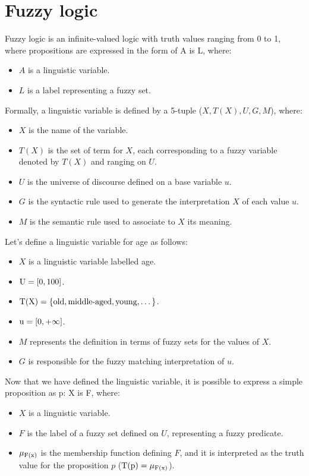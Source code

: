 \section{Fuzzy logic}

Fuzzy logic is an infinite-valued logic with truth values ranging from 0 to 1, where propositions are expressed in the form of A is L, where:
\begin{itemize}
    \item $A$ is a linguistic variable.
    \item $L$ is a label representing a fuzzy set.
\end{itemize}
Formally, a linguistic variable is defined by a 5-tuple ($X, T(X), U, G, M$), where: 
\begin{itemize}
    \item $X$ is the name of the variable.
    \item $T(X)$ is the set of term for $X$, each corresponding to a fuzzy variable denoted by $T(X)$ and ranging on $U$.
    \item $U$ is the universe of discourse defined on a base variable $u$.
    \item $G$ is the syntactic rule used to generate the interpretation $X$ of each value $u$.
    \item $M$ is the semantic rule used to associate to $X$ its meaning.
\end{itemize}
\begin{example}
    Let's define a linguistic variable for age as follows:
    \begin{itemize}
        \item $X$ is a linguistic variable labelled age.
        \item $\textnormal{U}=[0,100]$.
        \item $\textnormal{T(X)}=\{\text{old}, \text{middle-aged}, \text{young}, \dots\}$.
        \item $\textnormal{u}=[0,+\infty]$.
        \item $M$ represents the definition in terms of fuzzy sets for the values of $X$.
        \item $G$ is responsible for the fuzzy matching interpretation of $u$.
    \end{itemize}
\end{example}
Now that we have defined the linguistic variable, it is possible to express a simple proposition as p: X is F, where:
\begin{itemize}
    \item $X$ is a linguistic variable.
    \item $F$ is the label of a fuzzy set defined on $U$, representing a fuzzy predicate.
    \item $\mu_{\textnormal{F(x)}}$ is the membership function defining $F$, and it is interpreted as the truth value for the proposition $p$ ($\textnormal{T(p)}=\mu_{\textnormal{F(x)}}$).
\end{itemize}
